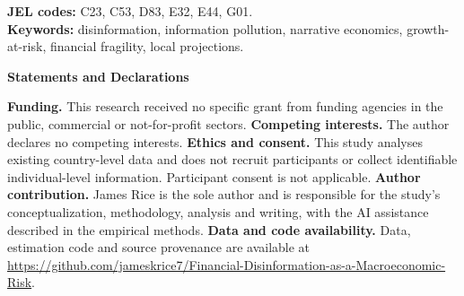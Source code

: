 \documentclass[11pt]{article}
\theoremstyle{definition}
\theoremstyle{remark}
\begin{document}
\begin{titlepage}
\begin{center}
\begin{abstract}
\noindent
This paper examines whether political disinformation is associated with
growth and whether banking stress amplifies that association. A frozen panel
of 175 countries over 2000--2025 combines expert-coded Digital Society Project
indicators with macroeconomic outcomes. The index describes the political
information environment rather than false financial messages. In the baseline
three-year regression, \GrowthTwoN{} observations from \GrowthTwoCountries{}
countries yield a cumulative-growth slope of $\GrowthTwo$ percentage points
per index standard deviation (standard error $\GrowthTwoSE$), evaluated at
mean conditioning states. The banking-stress interaction is $\FragilityTwo$
(standard error $\FragilityTwoSE$). Sample and conditioning choices affect
these estimates. Country-block bootstrap contrasts do not distinguish the
lower-tail slope from the median or upper tail. Adding the index worsens
tenth-quantile forecast loss by $\ForecastTailDeterioration$ percent in a
chronological evaluation; the gain interval includes zero. An illustrative
financing model explains how signal contamination and financial fragility
can interact, without implying unequal quantile slopes. The results separate
conditional associations, distributional differences and incremental
predictive value. They do not identify causal financial-message harm,
crisis thresholds or returns to information policy.
\end{abstract}
\end{center}
{\small\raggedright \textbf{JEL codes:} C23, C53, D83, E32, E44, G01.\\
\textbf{Keywords:} disinformation, information pollution, narrative
economics, growth-at-risk, financial fragility, local
projections.\par}
\vspace{0.25cm}
\begingroup\small
\noindent\textbf{Statements and Declarations}\par
\noindent\textbf{Funding.} This research received no specific grant from funding
agencies in the public, commercial or not-for-profit sectors.
\noindent\textbf{Competing interests.} The author declares no competing interests.
\noindent\textbf{Ethics and consent.} This study analyses existing country-level
data and does not recruit participants or collect identifiable individual-level
information. Participant consent is not applicable.
\noindent\textbf{Author contribution.} James Rice is the sole author and is responsible
for the study's conceptualization, methodology, analysis and writing, with the
AI assistance described in the empirical methods.
\noindent\textbf{Data and code availability.} Data, estimation code and source
provenance are available at
\url{https://github.com/jameskrice7/Financial-Disinformation-as-a-Macroeconomic-Risk}.
\endgroup
\vspace{0.35cm}
\begingroup
\renewcommand{\thefootnote}{}
\begin{NoHyper}
\end{NoHyper}
\endgroup
\setcounter{footnote}{0}
\end{titlepage}
\end{document}
